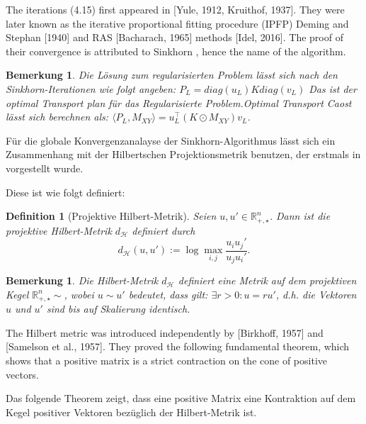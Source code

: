 \documentclass[11pt,a4paper]{article}
\newtheorem{definition}[theorem]{Definition}
\newtheorem{remark}[theorem]{Bemerkung}
\numberwithin{equation}{section}
\begin{document}
	
	
	
	The iterations (4.15) first appeared in [Yule, 1912,
	Kruithof, 1937]. They were later known as the iterative proportional fitting procedure
	(IPFP) Deming and Stephan [1940] and RAS [Bacharach, 1965] methods [Idel, 2016].
	The proof of their convergence is attributed to Sinkhorn \cite{sinkhorn1964relationship}, hence the name of the
	algorithm.
	
	
	
	\begin{remark}
		Die Lösung zum regularisierten Problem lässt sich nach den Sinkhorn-Iterationen wie folgt angeben: $P_L = diag(u_L)K diag(v_L)$ Das ist  der optimal Transport plan für das Regularisierte Problem.Optimal Transport Caost lässt sich berechnen als:
		$\langle P_L, M_{XY}\rangle = u_L ^\top ( K \odot M_{XY})v_L$.	\end{remark}	
	
	
	Für die globale Konvergenzanalayse der Sinkhorn-Algorithmus lässt sich ein Zusammenhang mit der Hilbertschen Projektionsmetrik benutzen, der erstmals in \cite{franklin_sinkhorn_convergence} vorgestellt wurde.
	
	Diese ist wie folgt definiert:
	
	\begin{definition}[Projektive Hilbert-Metrik]
		Seien $u,u' \in \mathbb{R}_{+,\star}^n$.
		Dann ist die projektive Hilbert-Metrik $d_\mathcal{H}$ definiert durch
		\begin{equation}
		d_\mathcal{H}(u,u') := \log \max_{i,j}{\frac{u_iu_j'}{u_ju_i'}}.
		\end{equation}
	\end{definition}
	
	\begin{remark}
		Die Hilbert-Metrik $ d_\mathcal{H}$ definiert eine Metrik auf dem projektiven Kegel $\mathbb{R}_{+, \star}^n \sim$, wobei $u \sim u'$ bedeutet, dass gilt: $\exists r >0:u=ru'$, d.h. die Vektoren $u$ und $u'$ sind bis auf Skalierung identisch.
		
	\end{remark}
	
	The Hilbert metric was introduced independently by [Birkhoff,
	1957] and [Samelson et al., 1957]. They proved the following fundamental theorem,
	which shows that a positive matrix is a strict contraction on the cone of positive
	vectors.
	
	Das folgende Theorem zeigt, dass eine positive Matrix eine Kontraktion auf dem Kegel positiver Vektoren bezüglich der Hilbert-Metrik ist.
	
\end{document}
